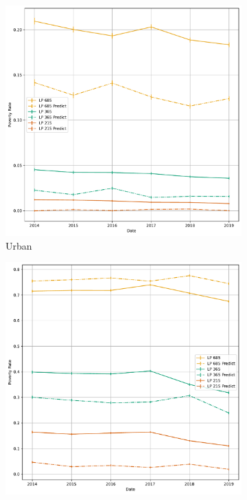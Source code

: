 \begin{figure}[H]
    \caption{Poverty Rate: Area}
    \centering
         \centering
         \begin{subfigure}[b]{0.47\textwidth}
            \centering
            \includegraphics[width=\textwidth]{../figures/fig8a_poverty_rate_time_series_urbano.pdf}        
            \caption{Urban}
         \end{subfigure}
         \hfill
         \begin{subfigure}[b]{0.47\textwidth}
            \centering
            \includegraphics[width=\textwidth]{../figures/fig8b_poverty_rate_time_series_rural.pdf}        

\end{subfigure}
\end{figure}
